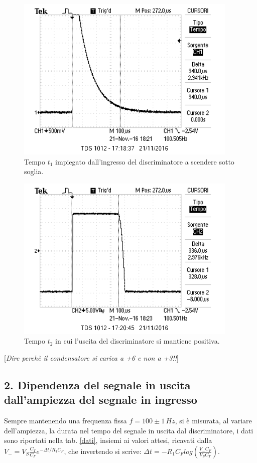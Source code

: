 \documentclass[10pt,a4paper]{article}
\newcommand{\rem}[1]{[\emph{#1}]}
\begin{document}
\begin{figure}[h]
\centering
\includegraphics[scale=1.0]{immagini/periodoEsponenziale.png}
\caption{Tempo $t_1$ impiegato dall'ingresso del discriminatore a scendere sotto soglia.}
\label{tempoEspo}
\end{figure}

\begin{figure}[h]
\centering
\includegraphics[scale=1.0]{immagini/tempoQuadra.png}
\caption{Tempo $t_2$ in cui l'uscita del discriminatore si mantiene positiva.}
\label{tempoUscita}
\end{figure}

\rem{Dire perchè il condensatore si carica a +6 e non a +3!!}


\subsection*{2. Dipendenza del segnale in uscita dall'ampiezza del segnale in ingresso}

Sempre mantenendo una frequenza fissa $f = 100 \pm 1 \, Hz$, si è misurata, al variare dell'ampiezza, la durata nel tempo del segnale in uscita dal discriminatore, i dati sono riportati nella tab. \ref{dati}, insiemi ai valori attesi, ricavati dalla $V_-=V_S \frac{C_T}{C_F} e^{- \Delta t/R_1 C_F}$, che invertendo si scrive: $\Delta t = -R_1 C_F log\left( \frac{V_- C_F}{V_S C_T}\right)$.
\end{document}

